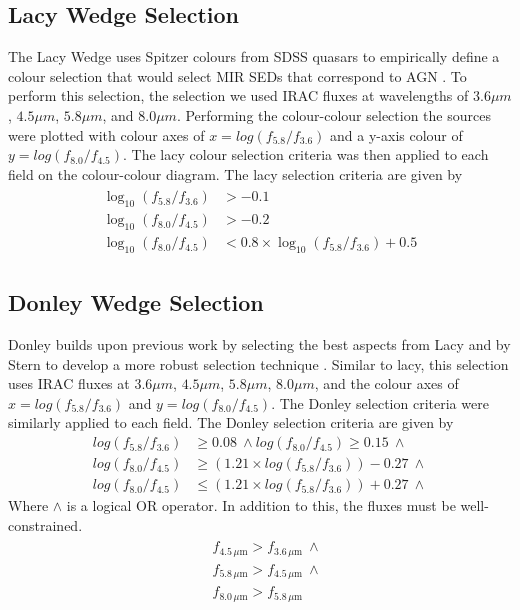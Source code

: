 \documentclass[11pt]{iopart}
\begin{document}
\subsection{Lacy Wedge Selection}
The Lacy Wedge uses Spitzer colours from SDSS quasars to empirically define a colour selection that would select MIR SEDs that correspond to AGN \cite{lacy_obscured_2004}. To perform this selection, the selection we used IRAC fluxes at wavelengths of $3.6\mu m$, $4.5\mu m$, $5.8\mu m$, and $8.0\mu m$. Performing the colour-colour selection the sources were plotted with colour axes of $x = log(f_{5.8}/f_{3.6})$ and a y-axis colour of $y =log(f_{8.0}/f_{4.5})$. The lacy colour selection criteria was then applied to each field on the colour-colour diagram. The lacy selection criteria are given by
\begin{align*}
    \begin{split}
       \log_{10}\left(f_{5.8}/f_{3.6}\right)&>-0.1\\
       \log_{10}\left(f_{8.0}/f_{4.5}\right)&>-0.2\\
       \log_{10}\left(f_{8.0}/f_{4.5}\right)&<0.8\times\log_{10}\left(f_{5.8}/f_{3.6}\right)+0.5
    \end{split}
\end{align*}
\subsection{Donley Wedge Selection}
Donley builds upon previous work by selecting the best aspects from Lacy \cite{lacy_obscured_2004, lacy_optical_2007} and by Stern \cite{stern_midinfrared_2005} to develop a more robust selection technique \cite{donley_identifying_2012}. Similar to lacy, this selection uses IRAC fluxes at $3.6\mu m$, $4.5\mu m$, $5.8\mu m$, $8.0\mu m$, and the colour axes of $x = log(f_{5.8}/f_{3.6})$ and $y = log(f_{8.0}/f_{4.5})$. The Donley selection criteria were similarly applied to each field. The Donley selection criteria are given by
\begin{align*}
    log(f_{5.8}/f_{3.6}) &\geq 0.08 \ \land log(f_{8.0}/f_{4.5}) \geq 0.15 \ \land\\
    log(f_{8.0}/f_{4.5}) &\geq (1.21 \times log(f_{5.8}/f_{3.6})) - 0.27 \ \land\\
    log(f_{8.0}/f_{4.5}) &\leq (1.21 \times log(f_{5.8}/f_{3.6})) + 0.27 \ \land
\end{align*}
Where $\land$ is a logical OR operator. In addition to this, the fluxes must be well-constrained.
\begin{align*}
    \begin{split}
        &f_{4.5\, \mu\text{m}} > f_{3.6\, \mu\text{m}}\  \land\\ 
        \ &f_{5.8\, \mu\text{m}} > f_{4.5\, \mu\text{m}}\  \land\\
        \ &f_{8.0\, \mu\text{m}} > f_{5.8\, \mu\text{m}}
    \end{split}
\end{align*}
\end{document}
